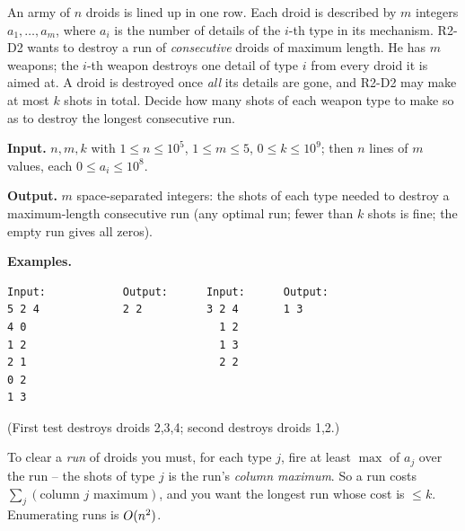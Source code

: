 \begin{problemstatement}
An army of \(n\) droids is lined up in one row.  Each droid is described by
\(m\) integers \(a_1,\dots,a_m\), where \(a_i\) is the number of details of the
\(i\)-th type in its mechanism.  R2-D2 wants to destroy a run of
\emph{consecutive} droids of maximum length.  He has \(m\) weapons; the \(i\)-th
weapon destroys one detail of type \(i\) from every droid it is aimed at.  A
droid is destroyed once \emph{all} its details are gone, and R2-D2 may make at
most \(k\) shots in total.  Decide how many shots of each weapon type to make so
as to destroy the longest consecutive run.

\textbf{Input.} \(n,m,k\) with \(1\le n\le 10^5\), \(1\le m\le 5\),
\(0\le k\le 10^9\); then \(n\) lines of \(m\) values, each \(0\le a_i\le 10^8\).

\textbf{Output.} \(m\) space-separated integers: the shots of each type needed to
destroy a maximum-length consecutive run (any optimal run; fewer than \(k\) shots
is fine; the empty run gives all zeros).

\textbf{Examples.}
\begin{verbatim}
Input:            Output:      Input:      Output:
5 2 4             2 2          3 2 4       1 3
4 0                              1 2
1 2                              1 3
2 1                              2 2
0 2
1 3
\end{verbatim}
(First test destroys droids 2,3,4; second destroys droids 1,2.)
\end{problemstatement}

\begin{attemptgate}
To clear a \emph{run} of droids you must, for each type \(j\), fire at least
\(\max\) of \(a_j\) over the run -- the shots of type \(j\) is the run's
\emph{column maximum}.  So a run costs \(\sum_j(\text{column }j\text{ maximum})\),
and you want the longest run whose cost is \(\le k\).  Enumerating runs is
\(O(n^2)\).
\end{attemptgate}

